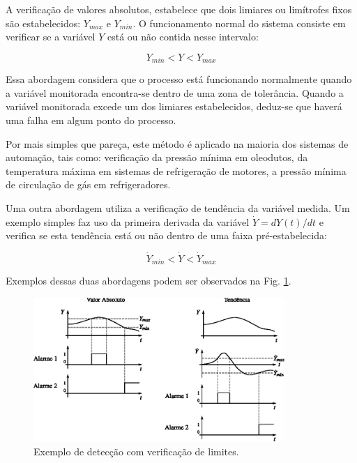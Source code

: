 A verificação de valores absolutos, estabelece que dois limiares ou limítrofes
fixos são estabelecidos: $Y_{max}$ e $Y_{min}$. O funcionamento normal do
sistema consiste em verificar se a variável $Y$ está ou não contida nesse
intervalo:

\begin{equation}
Y_{min} < Y < Y_{max}
\end{equation}

Essa abordagem considera que o processo está funcionando normalmente quando a
variável monitorada encontra-se dentro de uma zona de tolerância. Quando a
variável monitorada excede um dos limiares estabelecidos, deduz-se que haverá
uma falha em algum ponto do processo.

Por mais simples que pareça, este método é aplicado na maioria dos sistemas de
automação, tais como: verificação da pressão mínima em oleodutos, da temperatura
máxima em sistemas de refrigeração de motores, a pressão mínima de circulação de
gás em refrigeradores.

Uma outra abordagem utiliza a verificação de tendência da variável medida. Um
exemplo simples faz uso da primeira derivada da variável $\dot{Y} = dY(t)/dt$ e
verifica se esta tendência está ou não dentro de uma faixa pré-estabelecida:

\begin{equation}
\dot{Y}_{min} < \dot{Y} < \dot{Y}_{max}
\end{equation}

Exemplos dessas duas abordagens podem ser observados na Fig.
\ref{fig:detec_ver_lim}.

\begin{figure}[htb]
\centering
    \includegraphics[width=0.85\textwidth]{imgs/aspectos/eps/detec_ver_lim}
    \caption{Exemplo de detecção com verificação de limites.}
    \label{fig:detec_ver_lim}
\end{figure}

